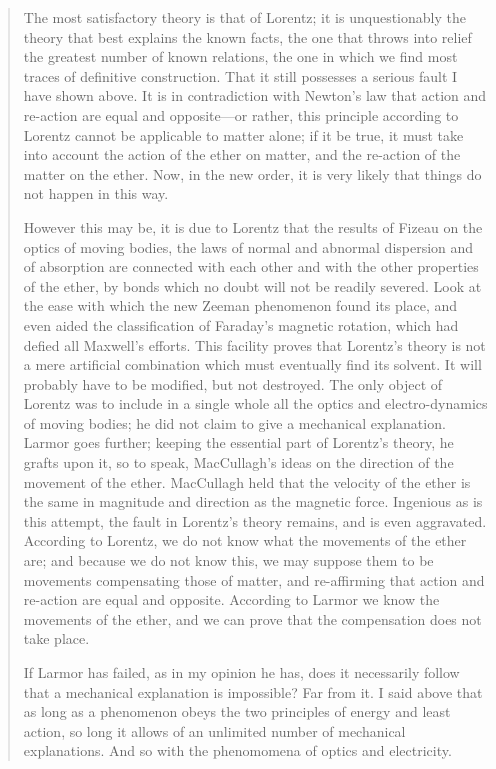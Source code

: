  \begin{quote}
     The most satisfactory theory is that of Lorentz; it is unquestionably the theory that best explains the known facts, the one that throws into relief the greatest number of known relations, the one in which we find most traces of definitive construction.  That it still possesses a serious fault I have shown above.  It is in contradiction with Newton's law that action and re-action are equal and opposite---or rather, this principle according to Lorentz cannot be applicable to matter alone; if it be true, it must take into account the action of the ether on matter, and the re-action of the matter on the ether.  Now, in the new order, it is very likely that things do not happen in this way.  
     
     However this may be, it is due to Lorentz that the results of Fizeau on the optics of moving bodies, the laws of normal and abnormal dispersion and of absorption are connected with each other and with the other properties of the ether, by bonds which no doubt will not be readily severed.  Look at the ease with which the new Zeeman phenomenon found its place, and even aided the classification of Faraday's magnetic rotation, which had defied all Maxwell's efforts.  This facility proves that Lorentz's theory is not a mere artificial combination which must eventually find its solvent.  It will probably have to be modified, but not destroyed.  
     The only object of Lorentz was to include in a single whole all the optics and electro-dynamics of moving bodies; he did not claim to give a mechanical explanation.  Larmor goes further; keeping the essential part of Lorentz's theory, he grafts upon it, so to speak, MacCullagh's ideas on the direction of the movement of the ether.  MacCullagh held that the velocity of the ether is the same in magnitude and direction as the magnetic force.  Ingenious as is this attempt, the fault in Lorentz's theory remains, and is even aggravated.  According to Lorentz, we do not know what the movements of the ether are; and because we do not know this, we may suppose them to be movements compensating those of matter, and re-affirming that action and re-action are equal and opposite.  According to Larmor we know the movements of the ether, and we can prove that the compensation does not take place.  
     
     If Larmor has failed, as in my opinion he has, does it necessarily follow that a mechanical explanation is impossible?  Far from it.  I said above that as long as a phenomenon obeys the two principles of energy and least action, so long it allows of an unlimited number of mechanical explanations.  And so with the phenomomena of optics and electricity.
     

\end{quote}
